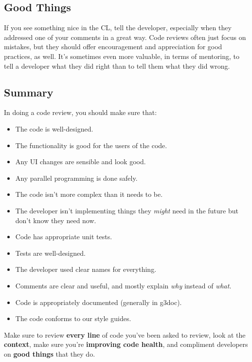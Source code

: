 \documentclass[
]{article}
\providecommand{\tightlist}{%
  \setlength{\itemsep}{0pt}\setlength{\parskip}{0pt}}
\begin{document}
\subsection{Good Things}\label{good-things}

If you see something nice in the CL, tell the developer, especially when
they addressed one of your comments in a great way. Code reviews often
just focus on mistakes, but they should offer encouragement and
appreciation for good practices, as well. It's sometimes even more
valuable, in terms of mentoring, to tell a developer what they did right
than to tell them what they did wrong.

\subsection{Summary}\label{summary-1}

In doing a code review, you should make sure that:

\begin{itemize}
\tightlist
\item
  The code is well-designed.
\item
  The functionality is good for the users of the code.
\item
  Any UI changes are sensible and look good.
\item
  Any parallel programming is done safely.
\item
  The code isn't more complex than it needs to be.
\item
  The developer isn't implementing things they \emph{might} need in the
  future but don't know they need now.
\item
  Code has appropriate unit tests.
\item
  Tests are well-designed.
\item
  The developer used clear names for everything.
\item
  Comments are clear and useful, and mostly explain \emph{why} instead
  of \emph{what}.
\item
  Code is appropriately documented (generally in g3doc).
\item
  The code conforms to our style guides.
\end{itemize}

Make sure to review \textbf{every line} of code you've been asked to
review, look at the \textbf{context}, make sure you're \textbf{improving
code health}, and compliment developers on \textbf{good things} that
they do.
\end{document}

